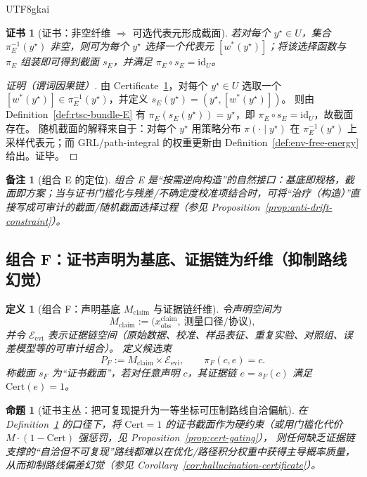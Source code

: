 \documentclass[12pt]{article}
\newtheorem{definition}{定义}[section]
\newtheorem{proposition}{命题}[section]
\newtheorem{remark}{备注}[section]
\newtheorem{certificate}{证书}[section]
\begin{document}
\begin{CJK*}{UTF8}{gkai}
\begin{certificate}[证书：非空纤维 $\Rightarrow$ 可选代表元形成截面]
\label{cert:inverse-design-as-section}
若对每个 $y^\star\in U$，集合 $\pi_E^{-1}(y^\star)$ 非空，则可为每个 $y^\star$ 选择一个代表元 $[w^\ast(y^\star)]$；将该选择函数与 $\pi_E$ 组装即可得到截面
  $s_E$，并满足 $\pi_E\circ s_E=\mathrm{id}_U$。
\end{certificate}

\begin{proof}[证明（谓词因果链）]
由 Certificate~\ref{cert:inverse-design-as-section}，对每个 $y^\star\in U$ 选取一个 $[w^\ast(y^\star)]\in\pi_E^{-1}(y^\star)$，并定义
  $s_E(y^\star)=(y^\star,[w^\ast(y^\star)])$。
则由 Definition~\ref{def:rtsc-bundle-E} 有 $\pi_E(s_E(y^\star))=y^\star$，即 $\pi_E\circ s_E=\mathrm{id}_U$，故截面存在。
随机截面的解释来自于：对每个 $y^\star$ 用策略分布 $\pi(\cdot\mid y^\star)$ 在 $\pi_E^{-1}(y^\star)$ 上采样代表元；而 GRL/path-integral 的权重更新由
  Definition~\ref{def:env-free-energy} 给出。证毕。
\end{proof}

\begin{remark}[组合 E 的定位]
组合 E 是“按需逆向构造”的自然接口：基底即规格，截面即方案；当与证书门槛化与残差/不确定度校准项结合时，可将“治疗（构造）”直接写成可审计的截面/随机截面选择过程（参见 Proposition~\ref{prop:anti-drift-constraint}）。
\end{remark}

\subsection{组合 F：证书声明为基底、证据链为纤维（抑制路线幻觉）}

\begin{definition}[组合 F：声明基底 $M_{\mathrm{claim}}$ 与证据链纤维]
\label{def:rtsc-bundle-F}
令声明空间为
\[
M_{\mathrm{claim}}
:=
\bigl(x_{\mathrm{obs}}^{\mathrm{claim}},\ \text{测量口径/协议}\bigr),
\]
并令 $\mathcal{E}_{\mathrm{evi}}$ 表示证据链空间（原始数据、校准、样品表征、重复实验、对照组、误差模型等的可审计组合）。
定义候选束
\[
P_F:=M_{\mathrm{claim}}\times \mathcal{E}_{\mathrm{evi}},
\qquad
\pi_F(c,e)=c.
\]
称截面 $s_F$ 为“证书截面”，若对任意声明 $c$，其证据链 $e=s_F(c)$ 满足 $\mathrm{Cert}(e)=1$。
\end{definition}

\begin{proposition}[证书主丛：把可复现提升为一等坐标可压制路线自洽偏航]
\label{prop:certificate-bundle-anti-hallucination}
在 Definition~\ref{def:rtsc-bundle-F} 的口径下，将 $\mathrm{Cert}=1$ 的证书截面作为硬约束（或用门槛化代价 $M\cdot(1-\mathrm{Cert})$ 强惩罚，见
  Proposition~\ref{prop:cert-gating}），
则任何缺乏证据链支撑的“自洽但不可复现”路线都难以在优化/路径积分权重中获得主导概率质量，从而抑制路线偏差幻觉（参见 Corollary~\ref{cor:hallucination-certificate}）。
\end{proposition}


\end{CJK*}
\end{document}
